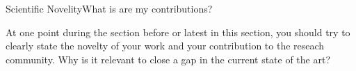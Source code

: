 \begin{frame}[t]{Scientific Novelity}{What is are my contributions?}

  At one point during the section before or latest in this section,
  you should try to clearly state the novelty of your work and your
  contribution to the reseach community.
  Why is it relevant to close a gap in the current state of the art?

\end{frame}
